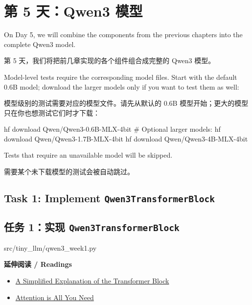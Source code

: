 \documentclass[11pt,a4paper]{article}
\newenvironment{zhpar}{%
  \par\smallskip\begingroup\color{zhcolor}\small\ignorespaces%
}{\endgroup\par\smallskip}
\begin{document}
\section*{第 5 天：Qwen3 模型}

On Day 5, we will combine the components from the previous chapters into the complete Qwen3 model.

\begin{zhpar}
第 5 天，我们将把前几章实现的各个组件组合成完整的 Qwen3 模型。
\end{zhpar}
Model-level tests require the corresponding model files. Start with the default 0.6B model; download the larger models only if you want to test them as well:

\begin{zhpar}
模型级别的测试需要对应的模型文件。请先从默认的 0.6B 模型开始；更大的模型只在你也想测试它们时才下载：
\end{zhpar}
\begin{codeblock}
hf download Qwen/Qwen3-0.6B-MLX-4bit
# Optional larger models:
hf download Qwen/Qwen3-1.7B-MLX-4bit
hf download Qwen/Qwen3-4B-MLX-4bit
\end{codeblock}

Tests that require an unavailable model will be skipped.

\begin{zhpar}
需要某个未下载模型的测试会被自动跳过。
\end{zhpar}
\subsection*{Task 1: Implement \texttt{Qwen3TransformerBlock}}

\subsection*{任务 1：实现 \texttt{Qwen3TransformerBlock}}

\begin{codeblock}
src/tiny_llm/qwen3_week1.py
\end{codeblock}

\textbf{ 延伸阅读 / Readings}

\begin{itemize}[leftmargin=1.6em,itemsep=0.15em,parsep=0pt]
\item \href{https://medium.com/@akhileshkapse/a-simplified-explanation-of-the-transformer-block-must-read-blog-for-nlp-enthusiasts-12ef240a62ac}{A Simplified Explanation of the Transformer Block}
\item \href{https://arxiv.org/pdf/1706.03762}{Attention is All You Need}
\end{itemize}
\end{document}
